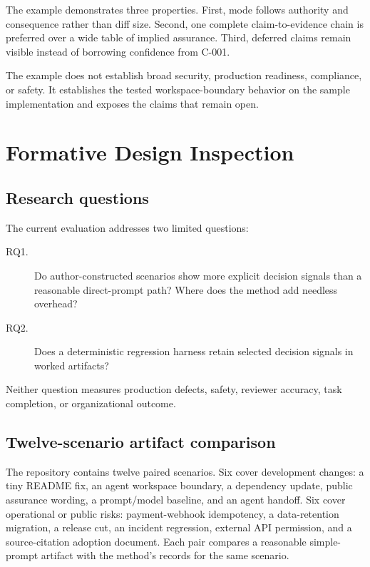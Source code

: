 \documentclass[11pt]{article}
\begin{document}
The example demonstrates three properties. First, mode follows authority and consequence rather than diff size. Second, one complete claim-to-evidence chain is preferred over a wide table of implied assurance. Third, deferred claims remain visible instead of borrowing confidence from C-001.

The example does not establish broad security, production readiness, compliance, or safety. It establishes the tested workspace-boundary behavior on the sample implementation and exposes the claims that remain open.

\section{Formative Design Inspection}
\label{sec:evaluation}

\subsection{Research questions}

The current evaluation addresses two limited questions:

\begin{description}
  \item[RQ1.] Do author-constructed scenarios show more explicit decision signals than a reasonable direct-prompt path? Where does the method add needless overhead?
  \item[RQ2.] Does a deterministic regression harness retain selected decision signals in worked artifacts?
\end{description}

Neither question measures production defects, safety, reviewer accuracy, task completion, or organizational outcome.

\subsection{Twelve-scenario artifact comparison}

The repository contains twelve paired scenarios. Six cover development changes: a tiny README fix, an agent workspace boundary, a dependency update, public assurance wording, a prompt/model baseline, and an agent handoff. Six cover operational or public risks: payment-webhook idempotency, a data-retention migration, a release cut, an incident regression, external API permission, and a source-citation adoption document. Each pair compares a reasonable simple-prompt artifact with the method's records for the same scenario.
\end{document}
